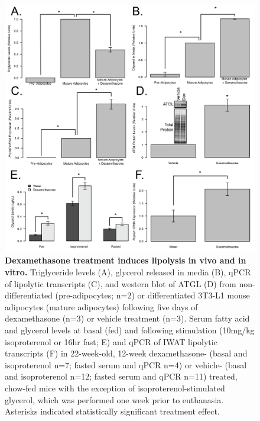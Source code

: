 \documentclass[11pt]{article} %
\begin{document}
\begin{figure}
  \begin{center}
    \includegraphics[width=\textwidth]{Figures_Figure_4.png}
  \end{center}
  \caption{\textbf{ Dexamethasone treatment induces lipolysis in vivo and in vitro.}  Triglyceride levels (A), glycerol released in media (B), qPCR of lipolytic transcripts (C), and western blot of ATGL (D) from non-differentiated (pre-adipocytes; n=2) or differentiated 3T3-L1 mouse adipocytes (mature adipocytes) following five days of dexamethasone (n=3) or vehicle treatment (n=3). Serum fatty acid and glycerol levels at basal (fed) and following stimulation (10mg/kg isoproterenol or 16hr fast; E) and qPCR of IWAT lipolytic transcripts (F) in 22-week-old, 12-week dexamethasone- (basal and isoproterenol n=7; fasted serum and qPCR n=4) or vehicle- (basal and isoproterenol n=12; fasted serum and qPCR n=11) treated, chow-fed mice with the exception of isoproterenol-stimulated glycerol, which was performed one week prior to euthanasia. Asterisks indicated statistically significant treatment effect.}
 \label{fig:4}
\end{figure}
\end{document}
